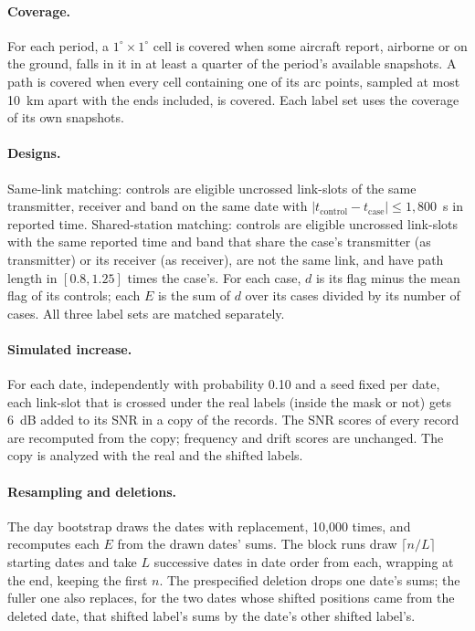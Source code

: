 \documentclass[11pt]{article}
\begin{document}
\begin{appendices}
\paragraph{Coverage.} For each period, a $1^\circ\times1^\circ$ cell is covered when some aircraft report, airborne or on the ground, falls in it in at least a quarter of the period's available snapshots. A path is covered when every cell containing one of its arc points, sampled at most 10~km apart with the ends included, is covered. Each label set uses the coverage of its own snapshots.

\paragraph{Designs.} Same-link matching: controls are eligible uncrossed link-slots of the same transmitter, receiver and band on the same date with $|t_{\text{control}}-t_{\text{case}}|\le1{,}800$~s in reported time. Shared-station matching: controls are eligible uncrossed link-slots with the same reported time and band that share the case's transmitter (as transmitter) or its receiver (as receiver), are not the same link, and have path length in $[0.8,1.25]$ times the case's. For each case, $d$ is its flag minus the mean flag of its controls; each $E$ is the sum of $d$ over its cases divided by its number of cases. All three label sets are matched separately.

\paragraph{Simulated increase.} For each date, independently with probability 0.10 and a seed fixed per date, each link-slot that is crossed under the real labels (inside the mask or not) gets 6~dB added to its SNR in a copy of the records. The SNR scores of every record are recomputed from the copy; frequency and drift scores are unchanged. The copy is analyzed with the real and the shifted labels.

\paragraph{Resampling and deletions.} The day bootstrap draws the dates with replacement, 10{,}000 times, and recomputes each $E$ from the drawn dates' sums. The block runs draw $\lceil n/L\rceil$ starting dates and take $L$ successive dates in date order from each, wrapping at the end, keeping the first $n$. The prespecified deletion drops one date's sums; the fuller one also replaces, for the two dates whose shifted positions came from the deleted date, that shifted label's sums by the date's other shifted label's.


\end{appendices}
\end{document}
